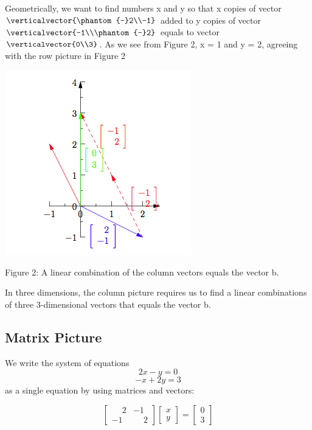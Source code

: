 \documentclass{ximera}
\begin{document}
\noindent
Geometrically, we want to find numbers x and y so that x copies of vector $\verticalvector{\phantom{-}2\\-1}$ added to y copies of vector $\verticalvector{-1\\\phantom{-}2}$ equals to vector $\verticalvector{0\\3}$. As we see from Figure 2, x = 1 and y = 2, agreeing with the row picture in Figure 2

\begin{center}
\includegraphics{Geometry2.png}

Figure 2: A linear combination of the column vectors equals the vector b.

\end{center}

\noindent
In three dimensions, the column picture requires us to find a linear combinations of three 3-dimensional vectors that equals the vector b.

\subsection*{Matrix Picture}


\noindent
We write the system of equations
\[2x-y = 0\]
\[-x+2y = 3\]
as a single equation by using matrices and vectors:

\[\begin{bmatrix} \phantom{-}2 & -1\\ -1 & \phantom{-}2 \end{bmatrix} \begin{bmatrix} x\\y \end{bmatrix} =  \begin{bmatrix} 0\\3 \end{bmatrix}\]\\
\end{document}
